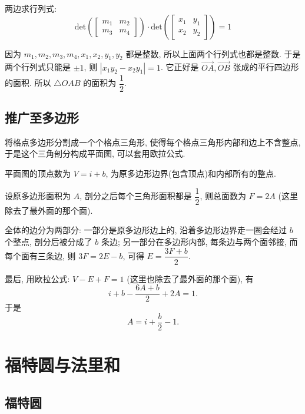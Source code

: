 两边求行列式:
\[ \mathrm{det}\left(
\begin{bmatrix}
m_1 & m_2 \\
m_3 & m_4
\end{bmatrix}
\right)\cdot\mathrm{det}\left(
\begin{bmatrix}
x_1 & y_1 \\
x_2 & y_2
\end{bmatrix}
\right) = 1\]

因为 $m_1,m_2,m_3,m_4, x_1, x_2, y_1, y_2$ 都是整数, 所以上面两个行列式也都是整数. 于是两个行列式只能是 $\pm 1$, 则 $|x_1y_2-x_2y_1| = 1$. 它正好是 $\vec{OA},\vec{OB}$ 张成的平行四边形的面积. 所以 $\triangle OAB$ 的面积为 $\dfrac{1}{2}$.

\subsection{推广至多边形}
将格点多边形分割成一个个格点三角形, 使得每个格点三角形内部和边上不含整点, 于是这个三角剖分构成平面图, 可以套用欧拉公式. 

平面图的顶点数为 $V=i+b$, 为原多边形边界(包含顶点)和内部所有的整点. 

设原多边形面积为 $A$, 剖分之后每个三角形面积都是 $\dfrac{1}{2}$, 则总面数为 $F = 2A$ (这里除去了最外面的那个面). 

全体的边分为两部分: 一部分是原多边形边上的, 沿着多边形边界走一圈会经过 $b$ 个整点, 剖分后被分成了 $b$ 条边; 另一部分在多边形内部, 每条边与两个面邻接, 而每个面有三条边, 则 $3F = 2E - b$, 可得 $E = \dfrac{3F+b}{2}$.

最后, 用欧拉公式: $V-E+F=1$ (这里也除去了最外面的那个面), 有
\[i+b - \frac{6A+b}{2} + 2A = 1.\]
于是
\[ A = i + \frac{b}{2} - 1 .\]


\newpage
\section{福特圆与法里和}
\subsection{福特圆}

